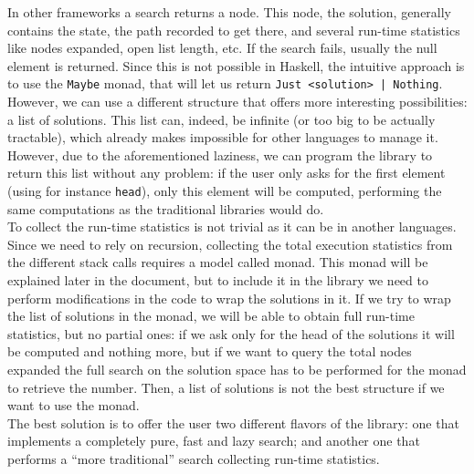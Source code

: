 In other frameworks \cite{cpp-search, cs4j, java-aima, hog2} a search returns a
node. This node, the solution, generally contains the state, the path recorded
to get there, and several run-time statistics like nodes expanded, open list
length, etc. If the search fails, usually the null element is returned. Since
this is not possible in Haskell, the intuitive approach is to use the
\texttt{Maybe} monad, that will let us return \texttt{Just <solution> |
  Nothing}. However, we can use a different structure that offers more
interesting possibilities: a list of solutions. This list can, indeed, be
infinite (or too big to be actually tractable), which already makes impossible
for other languages to manage it. However, due to the aforementioned laziness,
we can program the library to return this list without any problem: if the user
only asks for the first element (using for instance \texttt{head}), only this
element will be computed, performing the same computations as the traditional
libraries would do.\\

To collect the run-time statistics is not trivial as it can be in another
languages. Since we need to rely on recursion, collecting the total execution
statistics from the different stack calls requires a model called monad. %
This monad will be explained later in the document, but to include it in the
library we need to perform modifications in the code to wrap the solutions in
it. If we try to wrap the list of solutions in the monad, we will be able to
obtain full run-time statistics, but no partial ones: if we ask only for the
head of the solutions it will be computed and nothing more, but if we want to
query the total nodes expanded the full search on the solution space has to be
performed for the monad to retrieve the number. Then, a list of solutions is
not the best structure if we want to use the monad.\\

The best solution is to offer the user two different flavors of the library:
one that implements a completely pure, fast and lazy search; and another one
that performs a ``more traditional'' search collecting run-time statistics.\\

\newpage